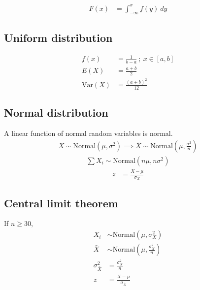 \documentclass{article}
\newcommand{\var}{\text{Var}}
\newcommand{\normal}{\text{Normal}}
\newcommand{\soft}[1]{\left( #1 \right)}
\begin{document}
\begin{multicols*}{2}
\begin{align*}
    F(x) &= \int_{-\infty}^x f(y) \ dy
\end{align*}

\subsection{Uniform distribution}
\begin{align*}
    f(x) &= \frac{1}{b - a} \ ; \ x \in [a, b] \\
    E(X) &= \frac{a + b}{2} \\
    \var(X) &= \frac{(a + b)^2}{12}
\end{align*}

\subsection{Normal distribution}
A linear function of normal random variables is normal.
\begin{align*}
    X \sim \normal(\mu, \sigma^2) \implies \bar{X} \sim \normal\soft{\mu, \frac{\sigma^2}{n}}
\end{align*}
\begin{align*}
    \sum X_i \sim \normal(n\mu, n\sigma^2)
\end{align*}
\begin{align*}
    z &= \frac{X - \mu}{\sigma_X}
\end{align*}

\subsection{Central limit theorem}
If $n \geq 30$,
\begin{align*}
    X_i &\sim \normal(\mu, \sigma_X^2) \\
    \bar{X} &\sim \normal\soft{\mu, \frac{\sigma_X^2}{n}} \\
    \sigma_{\bar{X}}^2 &= \frac{\sigma_X^2}{n} \\
    z &= \frac{\bar{X} - \mu}{\sigma_{\bar{X}}}
\end{align*}

\end{multicols*}
\end{document}
